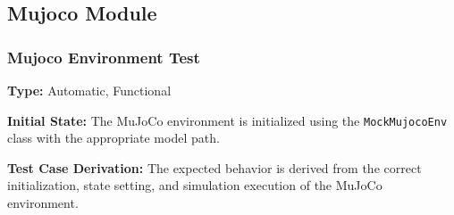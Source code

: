 \documentclass[12pt, titlepage]{article}
\begin{document}
\subsection{Mujoco Module}

\subsubsection{Mujoco Environment Test\\}


\textbf{Type:} Automatic, Functional

\textbf{Initial State:} The MuJoCo environment is initialized using the \texttt{MockMujocoEnv} class with the appropriate model path.

\textbf{Test Case Derivation:} The expected behavior is derived from the correct initialization, state setting, and simulation execution of the MuJoCo environment.
\end{document}
